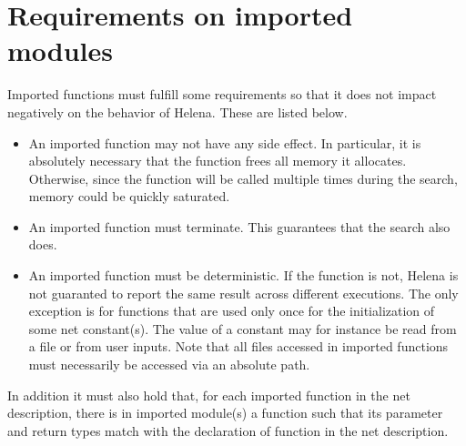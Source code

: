 \section{Requirements on imported modules}
Imported functions must fulfill some requirements so that it does not
impact negatively on the behavior of Helena.  These are listed below.
\begin{itemize}
\item An imported function may not have any side effect.  In
  particular, it is absolutely necessary that the function frees all
  memory it allocates.  Otherwise, since the function will be called
  multiple times during the search, memory could be quickly saturated.
\item An imported function must terminate.  This guarantees that the
  search also does.
\item An imported function must be deterministic.  If the function is
  not, Helena is not guaranted to report the same result across
  different executions.  The only exception is for functions that are
  used only once for the initialization of some net constant(s).  The
  value of a constant may for instance be read from a file or from
  user inputs.  Note that all files accessed in imported functions
  must necessarily be accessed via an absolute path.
\end{itemize}
In addition it must also hold that, for each imported function
 in the net description, there is in imported module(s) a
function  such that its parameter and
return types match with the declaration of function  in the
net description.
